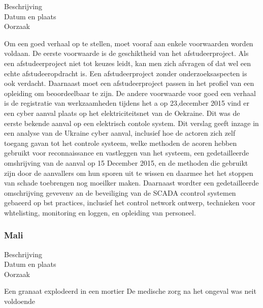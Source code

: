 	\begin{description}
	\item[Beschrijving]
	\item[Datum en plaats] 
	\item[Oorzaak]
\end{description}
Om een goed verhaal op te stellen, moet vooraf aan enkele voorwaarden
worden voldaan. De eerste voorwaarde is de geschiktheid van het
afstudeerproject. Als een afstudeerproject niet tot keuzes leidt, kan
men zich afvragen of dat wel een echte afstudeeropdracht is. Een
afstudeerproject zonder onderzoeksaspecten is ook verdacht. Daarnaast
moet een afstudeerproject passen in het profiel van een opleiding om
beoordeelbaar te zijn. De andere voorwaarde voor goed een verhaal is
de registratie van werkzaamheden tijdens het a
op 23,december 2015  vind er een cyber aanval plaats op het elektriciteitsnet van de Oekraine. Dit was de eerste bekende aanval op een elektrisch contole  system.  Dit verslag geeft inzage in een analyse van de Ukraine cyber aanval,
inclusief hoe de actoren zich zelf toegang gavan tot het controle systeem, welke methoden de acoren hebben gebruikt voor reconnaissance en vastleggen van het systeem, een gedetailleerde omshrijving van de aanval op 15 December 2015, en de methoden die gebruikt zijn door de aanvallers om hun sporen uit te wissen en daarmee het het stoppen van schade toebrengen  nog moeilker maken. Daarnaast wordter  een gedetailleerde omschrijving gevevenv an de beveiliging van de SCADA ccontrol systemen gebaeerd op bst practices, inclusief het control network ontwerp, technieken voor whtelisting, monitoring en loggen, en  opleiding van personeel.
\cite{Whitehead2017ukrainepoweroutage}

\cite{noauthor_2022-nm}
\cite{zetter2016GridHack}



\subsubsection{Mali}

	\begin{description}
	\item[Beschrijving]
	\item[Datum en plaats] 
	\item[Oorzaak]
\end{description}
Een granaat explodeerd in een mortier
De medische zorg na het ongeval was neit voldoende


